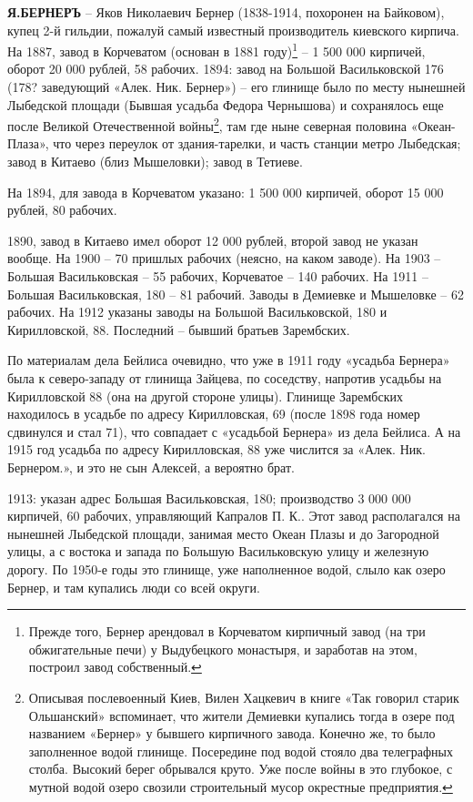 \noindent\textbf{Я.БЕРНЕРЪ} – Яков Николаевич Бернер (1838-1914, похоронен на Байковом), купец 2-й гильдии, пожалуй самый известный производитель киевского кирпича. На 1887, завод в Корчеватом (основан в 1881 году)\footnote{Прежде того, Бернер арендовал в Корчеватом кирпичный завод (на три обжигательные печи) у Выдубецкого монастыря, и заработав на этом, построил завод собственный.} – 1 500 000 кирпичей, оборот 20 000 рублей, 58 рабочих. 1894: завод на Большой Васильковской 176 (178? заведующий «Алек. Ник. Бернер») – его глинище было по месту нынешней Лыбедской площади (Бывшая усадьба Федора Чернышова) и сохранялось еще после Великой Отечественной войны\footnote{Описывая послевоенный Киев, Вилен Хацкевич в книге «Так говорил старик Ольшанский» вспоминает, что жители Демиевки купались тогда в озере под названием «Бернер» у бывшего кирпичного завода. Конечно же, то было заполненное водой глинище. Посередине под водой стояло два телеграфных столба. Высокий берег обрывался круто. Уже после войны в это глубокое, с мутной водой озеро свозили строительный мусор окрестные предприятия.}, там где ныне северная половина «Океан-Плаза», что через переулок от здания-тарелки, и часть станции метро Лыбедская; завод в Китаево (близ Мышеловки); завод в Тетиеве.

На 1894, для завода в Корчеватом указано: 1 500 000 кирпичей, оборот 15 000 рублей, 80 рабочих.

1890, завод в Китаево имел оборот 12 000 рублей, второй завод не указан вообще. На 1900 – 70 пришлых рабочих (неясно, на каком заводе). На 1903 – Большая Васильковская – 55 рабочих, Корчеватое – 140 рабочих. На 1911 – Большая Васильковская, 180 – 81 рабочий. Заводы в Демиевке и Мышеловке – 62 рабочих. На 1912 указаны заводы на Большой Васильковской, 180 и Кирилловской, 88. Последний – бывший братьев Зарембских. 

По материалам дела Бейлиса\cite{beylisdelo} очевидно, что уже в 1911 году «усадьба Бернера» была к северо-западу от глинища Зайцева, по соседству, напротив усадьбы на Кирилловской 88 (она на другой стороне улицы). Глинище Зарембских находилось в усадьбе по адресу Кирилловская, 69 (после 1898 года номер сдвинулся и стал 71), что совпадает с «усадьбой Бернера» из дела Бейлиса. А на 1915 год усадьба по адресу Кирилловская, 88 уже числится за «Алек. Ник. Бернером.», и это не сын Алексей, а вероятно брат.

1913: указан адрес Большая Васильковская, 180; производство 3 000 000 кирпичей, 60 рабочих, управляющий Капралов П. К.. Этот завод располагался на нынешней Лыбедской площади, занимая место Океан Плазы и до Загородной улицы, а с востока и запада по Большую Васильковскую улицу и железную дорогу. По 1950-е годы это глинище, уже наполненное водой, слыло как озеро Бернер, и там купались люди со всей округи. 

